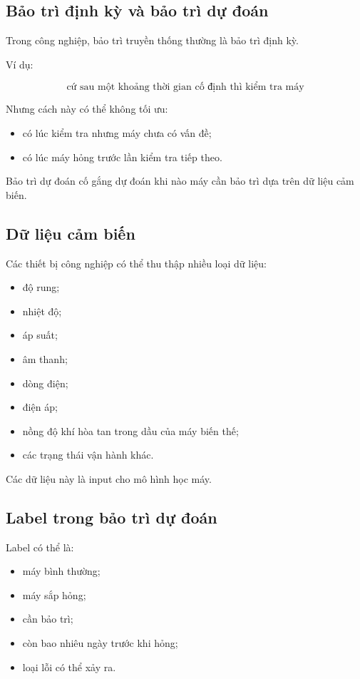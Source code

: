 \subsection{Bảo trì định kỳ và bảo trì dự đoán}

Trong công nghiệp, bảo trì truyền thống thường là bảo trì định kỳ.

Ví dụ:

\[
    \text{cứ sau một khoảng thời gian cố định thì kiểm tra máy}
\]

Nhưng cách này có thể không tối ưu:

\begin{itemize}
    \item có lúc kiểm tra nhưng máy chưa có vấn đề;
    \item có lúc máy hỏng trước lần kiểm tra tiếp theo.
\end{itemize}

Bảo trì dự đoán cố gắng dự đoán khi nào máy cần bảo trì dựa trên dữ liệu cảm biến.

\subsection{Dữ liệu cảm biến}

Các thiết bị công nghiệp có thể thu thập nhiều loại dữ liệu:

\begin{itemize}
    \item độ rung;
    \item nhiệt độ;
    \item áp suất;
    \item âm thanh;
    \item dòng điện;
    \item điện áp;
    \item nồng độ khí hòa tan trong dầu của máy biến thế;
    \item các trạng thái vận hành khác.
\end{itemize}

Các dữ liệu này là input cho mô hình học máy.

\subsection{Label trong bảo trì dự đoán}

Label có thể là:

\begin{itemize}
    \item máy bình thường;
    \item máy sắp hỏng;
    \item cần bảo trì;
    \item còn bao nhiêu ngày trước khi hỏng;
    \item loại lỗi có thể xảy ra.
\end{itemize}

